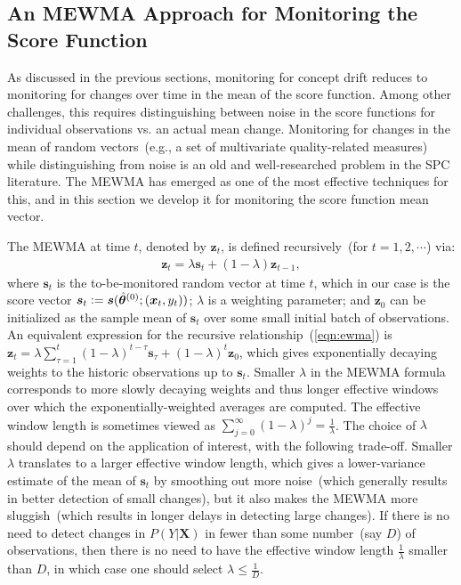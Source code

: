 \documentclass[twoside,11pt]{article}
\begin{document}
\subsection{An MEWMA Approach for Monitoring the Score Function}
\label{ss:MEWMA}
As discussed in the previous sections, monitoring for concept drift reduces to monitoring for changes over time in the mean of the score function. Among other challenges, this requires distinguishing between noise in the score functions for individual observations vs. an actual mean change. Monitoring for changes in the mean of random vectors~(e.g., a set of multivariate quality-related measures) while distinguishing from noise is an old and well-researched problem in the SPC literature. The MEWMA has emerged as one of the most effective techniques for this, and in this section we develop it for monitoring the score function mean vector.

The MEWMA at time $t$, denoted by $\bm{z}_t$, is defined recursively~(for $t=1,2,\cdots$) via:
\begin{align}
\bm {z}_t = \lambda \bm {s}_t + (1 - \lambda) \bm {z} _{t-1},
\label{eqn:ewma}
\end{align}
where $\bm {s}_t$ is the to-be-monitored random vector at time $t$, which in our case is the score vector $\bm {s}_t \vcentcolon= \bm{s}(\hat{\bm { \theta}}^{(0)};(\bm {x}_t, y_t))$; $ \lambda$ is a weighting parameter; and $\bm{z}_0$ can be initialized as the sample mean of $\bm {s}_t$ over some small initial batch of observations. An equivalent expression for the recursive relationship~(\ref{eqn:ewma}) is $\bm {z}_t = \lambda\sum _{\tau=1}^t (1-\lambda) ^{t-\tau} \bm{s} _{\tau} + (1-\lambda)^t \bm{z}_0$, which gives exponentially decaying weights to the historic observations up to $\bm{s}_t$. Smaller $\lambda$ in the MEWMA formula corresponds to more slowly decaying weights and thus longer effective windows over which the exponentially-weighted averages are computed. The effective window length is sometimes viewed as $\sum _{j=0}^\infty (1-\lambda)^j = \frac{1}{\lambda}$. The choice of $\lambda$ should depend on the application of interest, with the following trade-off. Smaller $\lambda$ translates to a larger effective window length, which gives a lower-variance estimate of the mean of $\bm{s}_t$ by smoothing out more noise~(which generally results in better detection of small changes), but it also makes the MEWMA more sluggish~(which results in longer delays in detecting large changes). If there is no need to detect changes in $P(Y|\bm{X})$ in fewer than some number~(say $D$) of observations, then there is no need to have the effective window length $\frac{1}{\lambda}$ smaller than $D$, in which case one should  select $\lambda \leq \frac{1}{D}$.
\end{document}
